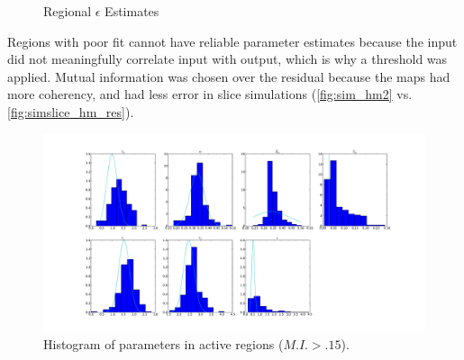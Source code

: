 \begin{figure}[H]
\centering
{}
\caption{Regional $\epsilon$ Estimates}
\label{fig:pmap6}
\end{figure}

Regions with poor fit cannot have reliable parameter estimates because the input did not meaningfully
correlate input with output, which is why a threshold was applied.
Mutual information was chosen over the residual because the
maps had more coherency, and had less error in slice simulations (\autoref{fig:sim_hm2} vs.
\autoref{fig:simslice_hm_res}).

\begin{figure}
\centering
\includegraphics[clip=truew,trim=8cm 4cm 8cm 4cm,width=16cm]{images/realhist}
\caption{Histogram of parameters in active regions ($M.I. > .15$).}
\label{fig:realhist}
\end{figure}

